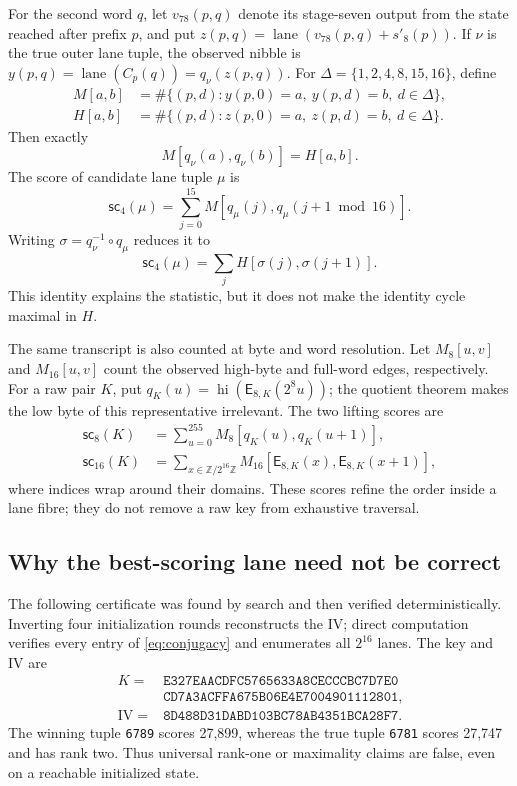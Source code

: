 \documentclass[10pt]{article}
\theoremstyle{plain}
\theoremstyle{definition}
\theoremstyle{remark}
\newcommand{\W}{\mathbb Z/2^{16}\mathbb Z}
\newcommand{\E}{\mathsf E}
\newcommand{\hi}{\operatorname{hi}}
\newcommand{\lane}{\operatorname{lane}}
\newcommand{\code}[1]{\texttt{#1}}
\begin{document}
For the second word \(q\), let \(v_{78}(p,q)\) denote its stage-seven output
from the state reached after prefix \(p\), and put
\(z(p,q)=\lane(v_{78}(p,q)+s'_8(p))\).  If \(\nu\) is the true outer lane
tuple, the observed nibble is
\(y(p,q)=\lane(C_p(q))=q_\nu(z(p,q))\).  For
\(\Delta=\{1,2,4,8,15,16\}\), define
\begin{align}
M[a,b]&=\#\{(p,d):y(p,0)=a,\ y(p,d)=b,\ d\in\Delta\},\nonumber\\
H[a,b]&=\#\{(p,d):z(p,0)=a,\ z(p,d)=b,\ d\in\Delta\}.
\end{align}
Then exactly
\begin{equation}
M[q_\nu(a),q_\nu(b)]=H[a,b].
\label{eq:conjugacy}
\end{equation}
The score of candidate lane tuple \(\mu\) is
\begin{equation}
\mathsf{sc}_4(\mu)=\sum_{j=0}^{15}M[q_\mu(j),q_\mu(j+1\bmod16)].
\label{eq:outerS4}
\end{equation}
Writing \(\sigma=q_\nu^{-1}\circ q_\mu\) reduces it to
\begin{equation}
\mathsf{sc}_4(\mu)=\sum_j H[\sigma(j),\sigma(j+1)].
\label{eq:scoreidentity}
\end{equation}
This identity explains the statistic, but it does not make the identity cycle
maximal in \(H\).

The same transcript is also counted at byte and word resolution.  Let
\(M_8[u,v]\) and \(M_{16}[u,v]\) count the observed high-byte and full-word
edges, respectively.  For a raw pair \(K\), put
\(q_K(u)=\hi(\E_{8,K}(2^8u))\); the quotient theorem makes the low byte of
this representative irrelevant.  The two lifting scores are
\begin{align}
\mathsf{sc}_8(K)&=\sum_{u=0}^{255}M_8[q_K(u),q_K(u+1)],\label{eq:outerS8}\\
\mathsf{sc}_{16}(K)&=\sum_{x\in\W}M_{16}[\E_{8,K}(x),\E_{8,K}(x+1)],
\label{eq:outerS16}
\end{align}
where indices wrap around their domains.  These scores refine the order inside
a lane fibre; they do not remove a raw key from exhaustive traversal.

\subsection{Why the best-scoring lane need not be correct}

The following certificate was found by search and then verified
deterministically.  Inverting four initialization rounds reconstructs the IV;
direct computation verifies every entry of \eqref{eq:conjugacy} and enumerates
all \(2^{16}\) lanes.  The key and IV are
\begin{align*}
K={}&\code{E327EAACDFC5765633A8CECCCBC7D7E0}\nonumber\\[-1mm]
&\code{CD7A3ACFFA675B06E4E7004901112801},\\
\mathrm{IV}={}&\code{8D488D31DABD103BC78AB4351BCA28F7}.
\end{align*}
The winning tuple \code{6789} scores 27,899, whereas the true tuple
\code{6781} scores 27,747 and has rank two.  Thus universal rank-one or
maximality claims are false, even on a reachable initialized state.
\end{document}
